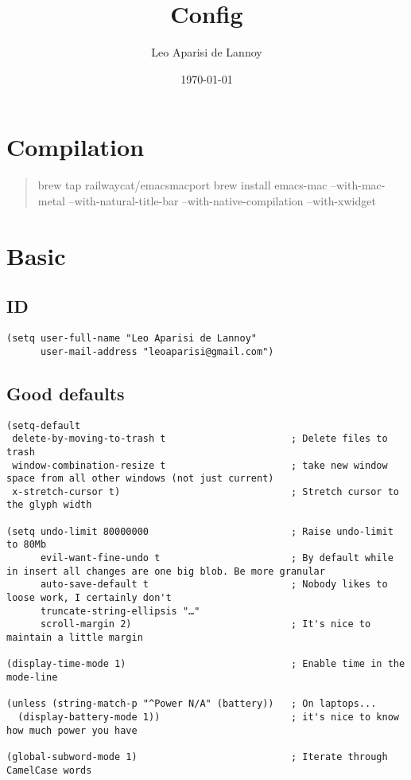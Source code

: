 \documentclass[c]{article}
\author{Leo Aparisi de Lannoy}
\date{\today}
\title{Config}
\theoremstyle{plain}%
\theoremstyle{definition}
\theoremstyle{remark}
\renewcommand{\tableofcontents}{\begingroup\hypersetup{hidelinks}\oldtoc\endgroup}
\begin{document}
\maketitle
\tableofcontents

\section{Compilation}
\label{sec:orgd831a28}
\begin{quote}
brew tap railwaycat/emacsmacport
brew install emacs-mac --with-mac-metal --with-natural-title-bar --with-native-compilation --with-xwidget
\end{quote}
\section{Basic}
\label{sec:orge534d5b}
\subsection{ID}
\label{sec:orgca90b44}
\begin{verbatim}
(setq user-full-name "Leo Aparisi de Lannoy"
      user-mail-address "leoaparisi@gmail.com")
\end{verbatim}
\subsection{Good defaults}
\label{sec:org1d77f7d}
\begin{verbatim}
(setq-default
 delete-by-moving-to-trash t                      ; Delete files to trash
 window-combination-resize t                      ; take new window space from all other windows (not just current)
 x-stretch-cursor t)                              ; Stretch cursor to the glyph width

(setq undo-limit 80000000                         ; Raise undo-limit to 80Mb
      evil-want-fine-undo t                       ; By default while in insert all changes are one big blob. Be more granular
      auto-save-default t                         ; Nobody likes to loose work, I certainly don't
      truncate-string-ellipsis "…"
      scroll-margin 2)                            ; It's nice to maintain a little margin

(display-time-mode 1)                             ; Enable time in the mode-line

(unless (string-match-p "^Power N/A" (battery))   ; On laptops...
  (display-battery-mode 1))                       ; it's nice to know how much power you have

(global-subword-mode 1)                           ; Iterate through CamelCase words
\end{verbatim}
\end{document}
